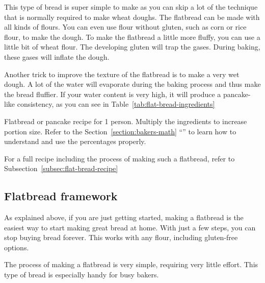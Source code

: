 This type of bread is super simple to make as you can skip
a lot of the technique that is normally required to make wheat doughs.
The flatbread can be made with all kinds of flours. You can even use
flour without gluten, such as corn or rice flour, to make the
dough. To make the flatbread a little more fluffy, you
can use a little bit of wheat flour. The developing gluten
will trap the gases. During baking, these gases will
inflate the dough.

Another trick to improve the texture of the flatbread is to
make a very wet dough. A lot of the water will evaporate
during the baking process and thus make the bread fluffier.
If your water content is very high, it will produce a
pancake-like consistency, as you can see in
Table~\ref{tab:flat-bread-ingredients}

\begin{table}[!htb]
    \centering
        
        \caption[Flatbread recipe]{Flatbread or pancake recipe for 1 person.
            Multiply the ingredients to increase portion size.  Refer to the
            Section~\ref{section:bakers-math}
            ``'' to learn how to understand and
            use the percentages properly.}%
            \label{tab:flat-bread-ingredients}
\end{table}

For a full recipe including the process of making such a flatbread,   refer to
Subsection~\ref{subsec:flat-bread-recipe}

\subsection{Flatbread framework}%
\label{subsec:flat-bread-framework}

As explained above, if you are just getting started, making a flatbread is the
easiest way to start making great bread at home. With just a
few steps, you can stop buying bread forever. This works with
any flour, including gluten-free options.

\begin{flowchart}[!htb]
\centering
  
  \caption[The process to make a sourdough flatbread]{The process of making a flatbread is very
      simple, requiring very little effort. This type of bread is especially
      handy for busy bakers.}%
  \label{fig:flat-bread-process}
\end{flowchart}

